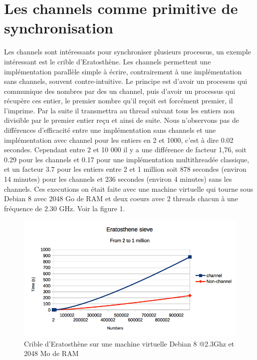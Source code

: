 \documentclass[a4paper]{report}
\begin{document}
\section {Les channels comme primitive de synchronisation}
Les channels sont intéressants pour synchroniser plusieurs processus, un exemple intéressant est le crible d'Eratosthène. Les channels permettent une implémentation parallèle simple à écrire, contrairement à une implémentation sans channels, souvent contre-intuitive. Le principe est d'avoir un processus qui communique des nombres par des un channel, puis d'avoir un processus qui récupère ces entier, le premier nombre qu'il reçoit est forcément premier, il l'imprime. Par la suite il transmettra au thread suivant tous les entiers non divisible par le premier entier reçu et ainsi de suite.
Nous n'observons pas de différences d'efficacité entre une implémentation sans channels et une implémentation avec channel pour les entiers en 2 et 1000, c'est à dire 0.02 secondes. Cependant entre 2 et 10 000 il y a une différence de facteur 1,76, soit 0.29 pour les channels et 0.17 pour une implémentation multithreadée classique, et un facteur 3.7 pour les entiers entre 2 et 1 million soit 878 secondes (environ 14 minutes) pour les channels et 236 secondes (environ 4 minutes) sans les channels. Ces executions on était faite avec une machine virtuelle qui tourne sous Debian 8 avec 2048 Go de RAM et deux coeurs avec 2 threads chacun à une fréquence de 2.30 GHz. Voir la figure 1.
\begin{figure}[H]
\begin{center}
\includegraphics[width=16cm]{era-chart.png}
\caption{Crible d'Eratosthène sur une machine virtuelle Debian 8 @2.3Ghz et 2048 Mo de RAM}
\label{figure1}
\end{center}
\end{figure}
\end{document}
